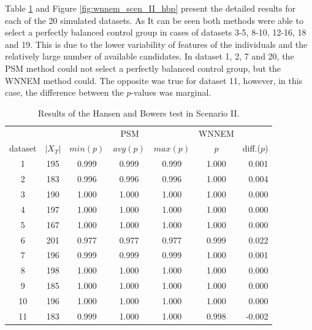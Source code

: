		Table \ref{tab:wnnem_scen_II_stat_separated} and Figure \ref{fig:wnnem_scen_II_hbp} present the detailed results for each of the 20 simulated datasets. As It can be seen both methods were able to select a perfectly balanced control group in cases of datasets 3-5, 8-10, 12-16, 18 and 19. This is due to the lower variability of features of the individuals and the relatively large number of available candidates. In dataset 1, 2, 7 and 20, the PSM method could not select a perfectly balanced control group, but the WNNEM method could. The opposite was true for dataset 11, however, in this case, the difference between the $p$-values was marginal.       
										
		\begin{table}[h]
			\caption{Results of the Hansen and Bowers test in Scenario II. %
			}
			\label{tab:wnnem_scen_II_stat_separated}
			\centering
			\begin{tabular}{ccccccr} 
				\toprule
				& & \multicolumn{3}{c}{PSM}
				& WNNEM & \\
				dataset & $|X_T|$ & $min (p)$ & $avg (p)$ & $max (p)$ & $p$   & diff.($p$) \\
				\midrule
				1       & 195     & 0.999     & 0.999     & 0.999     & 1.000 & 0.001      \\
				2       & 183     & 0.996     & 0.996     & 0.996     & 1.000 & 0.004      \\
				3       & 190     & 1.000     & 1.000     & 1.000     & 1.000 & 0.000      \\
				4       & 197     & 1.000     & 1.000     & 1.000     & 1.000 & 0.000      \\
				5       & 167     & 1.000     & 1.000     & 1.000     & 1.000 & 0.000      \\
				6       & 201     & 0.977     & 0.977     & 0.977     & 0.999 & 0.022      \\
				7       & 196     & 0.999     & 0.999     & 0.999     & 1.000 & 0.001      \\
				8       & 198     & 1.000     & 1.000     & 1.000     & 1.000 & 0.000      \\
				9       & 185     & 1.000     & 1.000     & 1.000     & 1.000 & 0.000      \\
				10      & 196     & 1.000     & 1.000     & 1.000     & 1.000 & 0.000      \\
				11      & 183     & 0.999     & 1.000     & 1.000     & 0.998 & -0.002     \\

\end{tabular}
\end{table}
